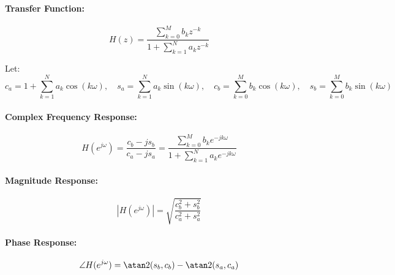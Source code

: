 \paragraph{Transfer Function:}
\begin{equation}
 H(z) = \frac{\sum_{k=0}^M  b_k z^{-k}} {1 + \sum_{k=1}^N a_k z^{-k}}
\end{equation}

Let:
\begin{equation}
 c_a = 1 + \sum_{k=1}^N a_k \cos(k \omega), \quad 
 s_a =     \sum_{k=1}^N a_k \sin(k \omega), \quad
 c_b =     \sum_{k=0}^M b_k \cos(k \omega), \quad
 s_b =     \sum_{k=0}^M b_k \sin(k \omega) 
\end{equation}

\paragraph{Complex Frequency Response:}
\begin{equation}
 H(e^{j \omega}) = \frac{c_b - j s_b}{c_a - j s_a} = \frac{\sum_{k=0}^M  b_k e^{-jk\omega}} {1 + \sum_{k=1}^N a_k e^{-jk\omega}}
\end{equation}


\paragraph{Magnitude Response:}
\begin{equation}
 |H(e^{j \omega})| = \sqrt{ \frac{c_b^2 + s_b^2}{c_a^2 + s_a^2} }
\end{equation}

\paragraph{Phase Response:}
\begin{equation}
 \angle H(e^{j \omega}) = \atan2(s_b, c_b) - \atan2(s_a, c_a)
\end{equation}






